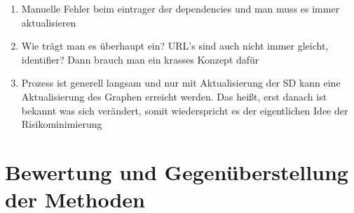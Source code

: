 \documentclass[
	12pt,
	BCOR=5mm,
	DIV=12,
	headinclude=on,
	footinclude=off,
	parskip=half,
	bibliography=totoc,
	listof=entryprefix,
	toc=listof,
	numbers=noenddot,
	plainfootsepline
]{scrreprt}
\begin{document}
\begin{enumerate}
	\item Manuelle Fehler beim eintrager der dependencies und man muss es immer aktualisieren
	\item Wie trägt man es überhaupt ein? URL's sind auch nicht immer gleicht, identifier? Dann brauch man ein krasses Konzept dafür
	\item Prozess ist generell langsam und nur mit Aktualisierung der SD kann eine Aktualisierung des Graphen erreicht werden. Das heißt, erst danach ist bekannt was sich verändert, somit wiederspricht es der eigentlichen Idee der Risikominimierung
\end{enumerate}

\section{Bewertung und Gegenüberstellung der Methoden}
\end{document}
